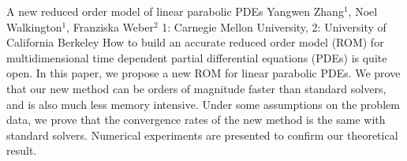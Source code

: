 \vspace{1.5ex}
\abs
{A new reduced order model of  linear parabolic PDEs}
{Yangwen Zhang$^{1}$, Noel Walkington$^{1}$, Franziska Weber$^{2}$}
{1: Carnegie Mellon University, 2: University of California Berkeley}
{How to build an accurate reduced order model (ROM) for  multidimensional time dependent partial differential equations (PDEs) is quite open. In this paper, we propose a new ROM for linear parabolic PDEs.  We prove that our new method can be orders of magnitude faster than
standard solvers, and is also much less memory intensive. Under some assumptions on the problem data, we prove that the convergence rates of the new method is the same with standard solvers. Numerical experiments are presented to confirm our theoretical result.}


